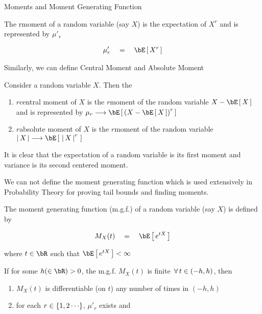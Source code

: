 \documentclass{article}
\begin{document}
\begin{ssection}{Moments and Moment Generating Function}

	\begin{definition}[Moment]
		The r\tth moment of a random variable (say $X$) is the expectation of $X^r$ and is represented by $\mu'_r$

		\begin{align*}
			\mu'_r	\eq	\E{X^r}
		\end{align*}
	\end{definition}

	Similarly, we can define Central Moment and Absolute Moment

	\begin{definition}
		Consider a random variable $X$. Then the

		\begin{enumerate}[label=(\roman*)]
			\item {} $r$\tth central moment of $X$ is the $r$\tth moment of the random variable $X - \E{X}$ and is represented by $\mu_r \lra \E{\para{X - \E{X}}^r}$
			\item {} $r$\tth absolute moment of $X$ is the $r$\tth moment of the random variable $\abs{X} \lra \E{\,\abs{X}^r\,}$
		\end{enumerate}
	\end{definition}

	It is clear that the expectation of a random variable is its first moment and variance is its second centered moment. \br

	We can not define the moment generating function which is used extensively in Probability Theory for proving tail bounds and finding moments.

	\begin{definition}
		The moment generating function (m.g.f.) of a random variable (say $X$) is defined by

		\begin{align*}
			M_X(t)	\eq	\E{\exp{tX}}
		\end{align*}

		where $t \in \bR$ such that $\E{\exp{tX}} < \infty$
	\end{definition}

	\begin{result}
		If for some $h (\in \bR) > 0$, the m.g.f. $M_X(t)$ is finite $\,\forall\, t \in (-h, h)$, then

		\begin{enumerate}[label=(\roman*)]
			\item $M_X(t)$ is differentiable (on $t$) any number of times in $(-h, h)$
			\item for each $r \in \left\{ {1, 2 \cdots} \right\}$, $\mu'_r$ exists and


\end{enumerate}
\end{result}
\end{ssection}
\end{document}
